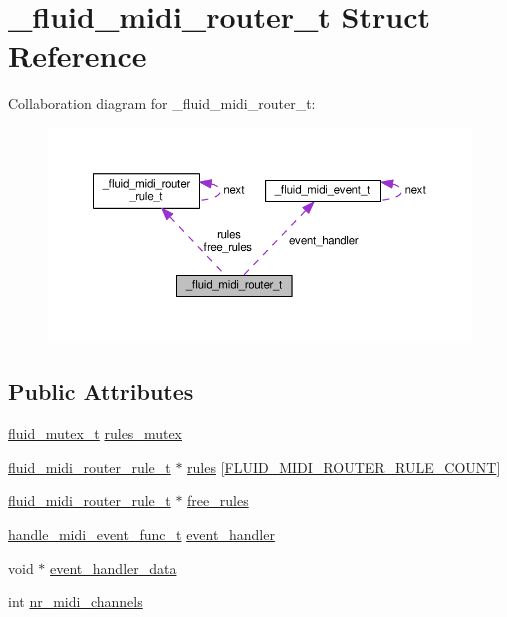 \hypertarget{struct__fluid__midi__router__t}{}\section{\+\_\+fluid\+\_\+midi\+\_\+router\+\_\+t Struct Reference}
\label{struct__fluid__midi__router__t}


Collaboration diagram for \+\_\+fluid\+\_\+midi\+\_\+router\+\_\+t\+:
\nopagebreak
\begin{figure}[H]
\begin{center}
\leavevmode
\includegraphics[width=350pt]{struct__fluid__midi__router__t__coll__graph}
\end{center}
\end{figure}
\subsection*{Public Attributes}
\begin{DoxyCompactItemize}
\item 
\hyperlink{fluid__sys_8h_a7252a44982e8ed2704689f563c8a12e3}{fluid\+\_\+mutex\+\_\+t} \hyperlink{struct__fluid__midi__router__t_a20926b15d48e1e02adaaebb1de8c69fa}{rules\+\_\+mutex}
\item 
\hyperlink{types_8h_a3154253ddb8f9b8f8f737c91f5973278}{fluid\+\_\+midi\+\_\+router\+\_\+rule\+\_\+t} $\ast$ \hyperlink{struct__fluid__midi__router__t_abb842c26031584c6b8b59591a8d30a11}{rules} \mbox{[}\hyperlink{midi_8h_ab798a0a5b95607556c9ecfbeaaab962ba6046a4845f7d72a92afed8ea13ab2a7a}{F\+L\+U\+I\+D\+\_\+\+M\+I\+D\+I\+\_\+\+R\+O\+U\+T\+E\+R\+\_\+\+R\+U\+L\+E\+\_\+\+C\+O\+U\+NT}\mbox{]}
\item 
\hyperlink{types_8h_a3154253ddb8f9b8f8f737c91f5973278}{fluid\+\_\+midi\+\_\+router\+\_\+rule\+\_\+t} $\ast$ \hyperlink{struct__fluid__midi__router__t_acbaf9d6e287c80b3a9b3f9ba7fc80fa6}{free\+\_\+rules}
\item 
\hyperlink{midi_8h_a42c3752e3adb54e0af802131c36a1129}{handle\+\_\+midi\+\_\+event\+\_\+func\+\_\+t} \hyperlink{struct__fluid__midi__router__t_ab16e26adcb0eb0a92ae52ab7adaaba06}{event\+\_\+handler}
\item 
void $\ast$ \hyperlink{struct__fluid__midi__router__t_a668689d932d287fd25c4ade5b4001b01}{event\+\_\+handler\+\_\+data}
\item 
int \hyperlink{struct__fluid__midi__router__t_a8311aaf34514ab19a44db90e443e9130}{nr\+\_\+midi\+\_\+channels}
\end{DoxyCompactItemize}


